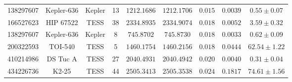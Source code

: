\begin{tabular}{l|cccccccc}
 138297607 &   Kepler-636 &  Kepler &         13 &       $1212.1686$ &       $1212.1706$ &    $0.015$ &  $0.0039$ &   $0.55 \pm 0.07$ \\
 166527623 &    HIP 67522 &    TESS &         38 &       $2334.8935$ &       $2334.9074$ &    $0.018$ &  $0.0052$ &   $3.59 \pm 0.32$ \\
 138297607 &   Kepler-636 &  Kepler &          8 &        $745.8702$ &        $745.8730$ &    $0.018$ &  $0.0033$ &   $0.62 \pm 0.09$ \\
 200322593 &      TOI-540 &    TESS &          5 &       $1460.1754$ &       $1460.2156$ &    $0.018$ &  $0.0444$ &  $62.54 \pm 1.22$ \\
 410214986 &     DS Tuc A &    TESS &         27 &       $2040.4931$ &       $2040.4942$ &    $0.020$ &  $0.0040$ &   $0.31 \pm 0.04$ \\
 434226736 &        K2-25 &    TESS &         44 &       $2505.3413$ &       $2505.3538$ &    $0.024$ &  $0.1817$ &  $74.61 \pm 1.56$ \\
\hline

\end{tabular}
